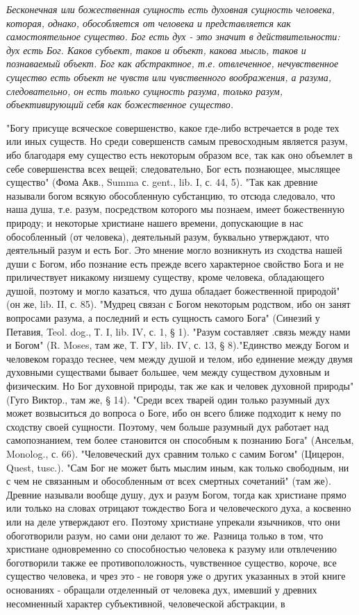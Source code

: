 \documentclass[12pt,oneside]{book}
\begin{document}
\bigskip

\emph{Бесконечная или божественная сущность есть духовная сущность человека, которая, однако, обособляется от человека и представляется как самостоятельное существо. Бог есть дух - это значит в действительности: дух есть Бог. Каков субъект, таков и объект, какова мысль, таков и познаваемый объект. Бог как абстрактное, т.е. отвлеченное, нечувственное существо есть объект не чувств или чувственного воображения, а разума, следовательно, он есть только сущность разума, только разум, объективирующий себя как божественное существо.}

"Богу присуще всяческое совершенство, какое где-либо встречается в роде тех или иных существ. Но среди совершенств самым превосходным является разум, ибо благодаря ему существо есть некоторым образом все, так как оно объемлет в себе совершенства всех вещей; следовательно, Бог есть познающее, мыслящее существо" (Фома Акв., Summa с. gent., lib. I, с. 44, 5). "Так как древние называли богом всякую обособленную субстанцию, то отсюда следовало, что наша душа, т.е. разум, посредством которого мы познаем, имеет божественную природу; и некоторые христиане нашего времени, допускающие в нас обособленный (от человека), деятельный разум, буквально утверждают, что деятельный разум и есть Бог. Это мнение могло возникнуть из сходства нашей души с Богом, ибо познание есть прежде всего характерное свойство Бога и не приличествует никакому низшему существу, кроме человека, обладающего душой, поэтому и могло казаться, что душа обладает божественной природой" (он же, lib. II, с. 85). "Мудрец связан с Богом некоторым родством, ибо он занят вопросами разума, а последний и есть сущность самого Бога" (Синезий у Петавия, Teol. dog., Т. I, lib. IV, с. 1, § 1). "Разум составляет .связь между нами и Богом" (R. Moses, там же, Т. ГУ, lib. IV, с. 13, § 8)."Единство между Богом и человеком гораздо теснее, чем между душой и телом, ибо единение между двумя духовными существами бывает большее, чем между существом духовным и физическим. Но Бог духовной природы, так же как и человек духовной природы" (Гуго Виктор., там же, § 14). "Среди всех тварей один только разумный дух может возвыситься до вопроса о Боге, ибо он всего ближе подходит к нему по сходству своей сущности. Поэтому, чем больше разумный дух работает над самопознанием, тем более становится он способным к познанию Бога" (Ансельм, Monolog., с. 66). "Человеческий дух сравним только с самим Богом" (Цицерон, Quest, tusc.). "Сам Бог не может быть мыслим иным, как только свободным, ни с чем не связанным и обособленным от всех смертных сочетаний" (там же). Древние называли вообще душу, дух и разум Богом, тогда как христиане прямо или только на словах отрицают тождество Бога и человеческого духа, а косвенно или на деле утверждают его. Поэтому христиане упрекали язычников, что они обоготворили разум, но сами они делают то же. Разница только в том, что христиане одновременно со способностью человека к разуму или отвлечению боготворили также ее противоположность, чувственное существо, короче, все существо человека, и чрез это - не говоря уже о других указанных в этой книге основаниях - обращали отделенный от человека дух, имевший у древних несомненный характер субъективной, человеческой абстракции, в 
\end{document}
